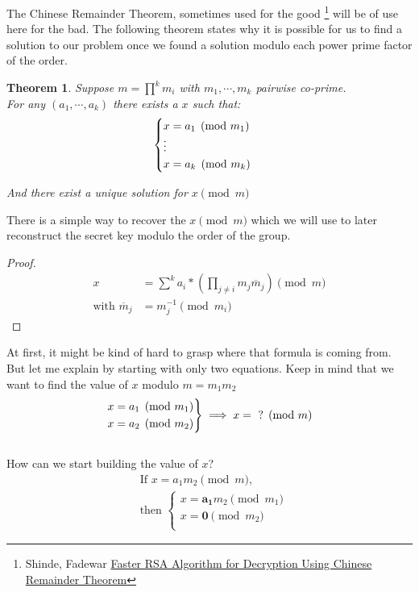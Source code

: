 \documentclass[a4paper,11pt,twocolumn]{article}
\newenvironment{rcases}
  {\left.\begin{aligned}}
  {\end{aligned}\right\rbrace}
\newtheorem{theorem}{Theorem}
\begin{document}
The Chinese Remainder Theorem, sometimes used for the good \footnote{ Shinde, Fadewar \href{http://www.techscience.com/doi/10.3970/icces.2008.005.255.pdf}{Faster RSA Algorithm for Decryption Using Chinese Remainder Theorem}}\cite{fasterRSA} will be of use here for the bad. The following theorem states why it is possible for us to find a solution to our problem once we found a solution modulo each power prime factor of the order.

\begin{theorem}
Suppose $m = \prod\limits^{k} m_i$ with $m_1, \cdots, m_k$ pairwise co-prime.\\

For any $(a_1, \cdots, a_k)$ there exists a $x$ such that:
$$
\begin{cases}
x= a_1 \pmod{m_1}\\
\vdots\\
x= a_k \pmod{m_k}\\
\end{cases}\\
$$

And there exist a unique solution for $x \pmod{m}$
\end{theorem}

There is a simple way to recover the $x \pmod{m}$ which we will use to later reconstruct the secret key modulo the order of the group.
\begin{proof}
  \begin{align*}
      x &= \sum^{k} a_i * (\prod_{j \neq i} m_{j} \overline{m}_{j}) \pmod{m} \\
      \mbox{with }\overline{m}_{j} &= m_{j}^{-1} \pmod{m_i}
  \end{align*}
\end{proof}
At first, it might be kind of hard to grasp where that formula is coming from. But let me explain by starting with only two equations. Keep in mind that we want to find the value of $x$ modulo $m = m_1 m_2$
\[
\begin{rcases}
x = a_1 \pmod{m_1}\\
x = a_2 \pmod{m_2}
\end{rcases}
\implies x = \text{ ?} \pmod{m}
\]\\
How can we start building the value of $x$?
\begin{align*}
&\text{If } x = a_1  m_2\pmod{m} \text{,}\\
&\text{then }
\begin{cases}
x = \boldsymbol{a_1} m_2 \pmod{m_1}\\
x = \boldsymbol{0} \pmod{m_2}\\
\end{cases}
\end{align*}
\end{document}
